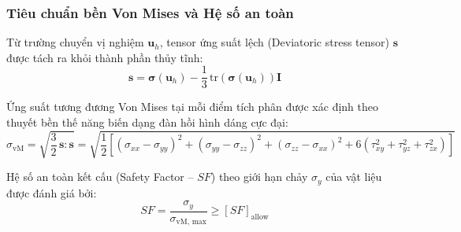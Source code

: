 \documentclass[12pt,a4paper]{article}
\begin{document}
\subsubsection{Tiêu chuẩn bền Von Mises và Hệ số an toàn}
Từ trường chuyển vị nghiệm $\mathbf{u}_h$, tensor ứng suất lệch (Deviatoric stress tensor) $\mathbf{s}$ được tách ra khỏi thành phần thủy tĩnh:
\begin{equation}
    \mathbf{s} = \boldsymbol{\sigma}(\mathbf{u}_h) - \frac{1}{3}\,\text{tr}(\boldsymbol{\sigma}(\mathbf{u}_h))\mathbf{I}
\end{equation}

Ứng suất tương đương Von Mises tại mỗi điểm tích phân được xác định theo thuyết bền thế năng biến dạng đàn hồi hình dáng cực đại:
\begin{equation}
    \sigma_{\text{vM}} = \sqrt{\frac{3}{2}\,\mathbf{s} : \mathbf{s}} = \sqrt{\frac{1}{2}\left[(\sigma_{xx}-\sigma_{yy})^2 + (\sigma_{yy}-\sigma_{zz})^2 + (\sigma_{zz}-\sigma_{xx})^2 + 6(\tau_{xy}^2 + \tau_{yz}^2 + \tau_{zx}^2)\right]}
\end{equation}

Hệ số an toàn kết cấu (Safety Factor -- $SF$) theo giới hạn chảy $\sigma_y$ của vật liệu được đánh giá bởi:
\begin{equation}
    SF = \frac{\sigma_y}{\sigma_{\text{vM, max}}} \ge [SF]_{\text{allow}}
\end{equation}
\end{document}
